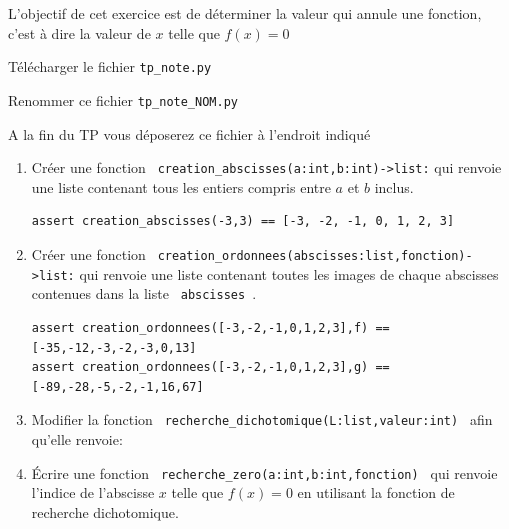 \documentclass[a4paper,12pt,openany]{book}
\begin{document}
\newpage

\exo

L'objectif de cet exercice est de déterminer la valeur qui annule une fonction, c'est à dire la valeur de $x$ telle que $f(x)=0$\\

\begin{liste}
	\item Télécharger le fichier \verb+tp_note.py+
	\item Renommer ce fichier \verb+tp_note_NOM.py+
	\item A la fin du TP vous déposerez ce fichier à l'endroit indiqué
\end{liste}

\medskip

\begin{enumerate}
	\item Créer une fonction \verb+ creation_abscisses(a:int,b:int)->list:+ qui renvoie une liste contenant tous les entiers compris entre $a$ et $b$ inclus.
	
\begin{lstlisting}[numbers = none]
assert creation_abscisses(-3,3) == [-3, -2, -1, 0, 1, 2, 3]
\end{lstlisting}		

\medskip

\item Créer une fonction \verb+ creation_ordonnees(abscisses:list,fonction)->list:+ qui renvoie une liste contenant toutes les images de chaque abscisses contenues dans la liste \verb+ abscisses +.
	
\begin{lstlisting}[numbers = none]
assert creation_ordonnees([-3,-2,-1,0,1,2,3],f) == [-35,-12,-3,-2,-3,0,13]
assert creation_ordonnees([-3,-2,-1,0,1,2,3],g) == [-89,-28,-5,-2,-1,16,67]
\end{lstlisting}		

\medskip
\item Modifier la fonction \verb+ recherche_dichotomique(L:list,valeur:int) + afin qu'elle renvoie:


\medskip

\item Écrire une fonction \verb+ recherche_zero(a:int,b:int,fonction) + qui renvoie l'indice de l'abscisse $x$ telle que $f(x)=0$ en utilisant la fonction de recherche dichotomique.


\end{enumerate}
\end{document}
